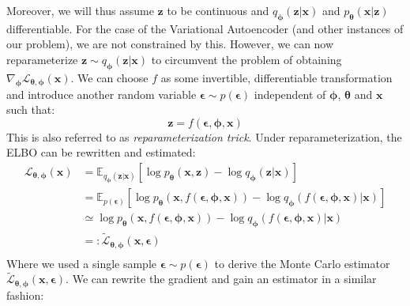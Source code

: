 \documentclass[12pt]{report}
\theoremstyle{definition}
\begin{document}
Moreover, we will thus assume $\mathbf{z}$ to be continuous and $q_{\pmb{\phi}}(\mathbf{z}|\mathbf{x})$ and $p_{\pmb{\theta}}(\mathbf{x}|\mathbf{z})$ differentiable. For the case of the Variational Autoencoder (and other instances of our problem), we are not constrained by this. However, we can now reparameterize $\mathbf{z} \sim q_{\pmb{\phi}}(\mathbf{z}|\mathbf{x})$ to circumvent the problem of obtaining $\nabla_{\pmb{\phi}}\mathcal{L}_{\pmb{\theta}, \pmb{\phi}}(\mathbf{x})$. We can choose $f$ as some invertible, differentiable transformation and introduce another random variable $\pmb{\epsilon} \sim p(\pmb{\epsilon})$ independent of $\pmb{\phi}$, $\pmb{\theta}$ and $\mathbf{x}$ such that:
\begin{equation}
\mathbf{z} = f(\pmb{\epsilon}, \pmb{\phi}, \mathbf{x})
\end{equation}
This is also referred to as \emph{reparameterization trick}. Under reparameterization, the ELBO can be rewritten and estimated:
\begin{equation}
\begin{split}
\mathcal{L}_{\pmb{\theta}, \pmb{\phi}}(\mathbf{x})
& = \mathbb{E}_{q_{\pmb{\phi}}(\mathbf{z}|\mathbf{x})}\left[ \log p_{\pmb{\theta}}(\mathbf{x}, \mathbf{z}) - \log q_{\pmb{\phi}}(\mathbf{z}|\mathbf{x})\right]\\
& = \mathbb{E}_{p(\pmb{\epsilon})}\left[ \log p_{\pmb{\theta}}(\mathbf{x}, f(\pmb{\epsilon}, \pmb{\phi}, \mathbf{x})) - \log q_{\pmb{\phi}}(f(\pmb{\epsilon}, \pmb{\phi}, \mathbf{x})|\mathbf{x}) \right]	\\
& \simeq \log p_{\pmb{\theta}}(\mathbf{x}, f(\pmb{\epsilon}, \pmb{\phi}, \mathbf{x})) - \log q_{\pmb{\phi}}(f(\pmb{\epsilon}, \pmb{\phi}, \mathbf{x})|\mathbf{x})\\
& =: \tilde{\mathcal{L}}_{\pmb{\theta}, \pmb{\phi}}(\mathbf{x}, \pmb{\epsilon})\\
\end{split}
\end{equation}
Where we used a single sample $\pmb{\epsilon}\sim p(\pmb{\epsilon})$ to derive the Monte Carlo estimator $\tilde{\mathcal{L}}_{\pmb{\theta}, \pmb{\phi}}(\mathbf{x}, \pmb{\epsilon})$. We can rewrite the gradient and gain an estimator in a similar fashion:
\end{document}
